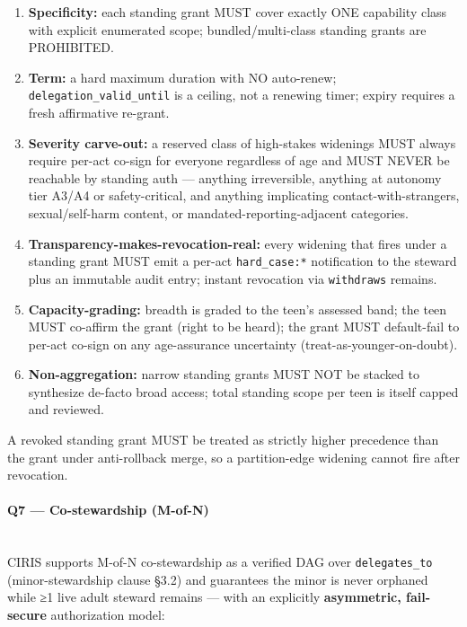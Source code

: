 \documentclass[11pt]{article}
\begin{document}
\begin{enumerate}\setlength\itemsep{0pt}
\item \textbf{Specificity:} each standing grant MUST cover exactly ONE capability class with explicit enumerated scope; bundled/multi-class standing grants are PROHIBITED.
\item \textbf{Term:} a hard maximum duration with NO auto-renew; \texttt{delegation\_valid\_until} is a ceiling, not a renewing timer; expiry requires a fresh affirmative re-grant.
\item \textbf{Severity carve-out:} a reserved class of high-stakes widenings MUST always require per-act co-sign for everyone regardless of age and MUST NEVER be reachable by standing auth — anything irreversible, anything at autonomy tier A3/A4 or safety-critical, and anything implicating contact-with-strangers, sexual/self-harm content, or mandated-reporting-adjacent categories.
\item \textbf{Transparency-makes-revocation-real:} every widening that fires under a standing grant MUST emit a per-act \texttt{hard\_case:*} notification to the steward plus an immutable audit entry; instant revocation via \texttt{withdraws} remains.
\item \textbf{Capacity-grading:} breadth is graded to the teen's assessed band; the teen MUST co-affirm the grant (right to be heard); the grant MUST default-fail to per-act co-sign on any age-assurance uncertainty (treat-as-younger-on-doubt).
\item \textbf{Non-aggregation:} narrow standing grants MUST NOT be stacked to synthesize de-facto broad access; total standing scope per teen is itself capped and reviewed.
\end{enumerate}


A revoked standing grant MUST be treated as strictly higher precedence than the grant under anti-rollback merge, so a partition-edge widening cannot fire after revocation.


\paragraph{Q7 — Co-stewardship (M-of-N)}\mbox{}\\


CIRIS supports M-of-N co-stewardship as a verified DAG over \texttt{delegates\_to} (minor-stewardship clause §3.2) and guarantees the minor is never orphaned while ≥1 live adult steward remains — with an explicitly \textbf{asymmetric, fail-secure} authorization model:
\end{document}
